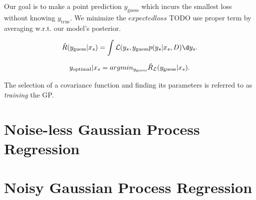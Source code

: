 Our goal is to make a point prediction $y_\text{guess}$ which incurs the
smallest loss without knowing $y_\text{true}$. We minimize the $expected loss$
{TODO use proper term} by averaging w.r.t. our model's posterior.

\begin{equation}
  \hat R(y_\text{guess} | x_s ) = \int \gL (y_s, y_\text{guess} p(y_s | x_s, D) \d y_s.
\end{equation}

\begin{equation}
  y_\text{optimal} | x_s = argmin_{y_\text{guess}} \hat R_{\mathcal{L}}(y_\text{guess} | x_s).
\end{equation}

The selection of a covariance function and finding its parameters is referred
to as \emph{training} the GP.


\section{Noise-less Gaussian Process Regression}

\section{Noisy Gaussian Process Regression}


